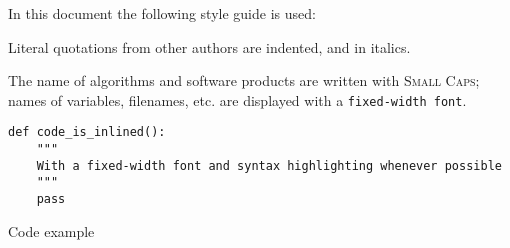 In this document the following style guide is used:

\begin{displayquote}
    Literal quotations from other authors are indented, and in italics.
\end{displayquote}

The name of algorithms and software products are written with \textsc{Small Caps};
names of variables, filenames, etc. are displayed with a \texttt{fixed-width font}.

\begin{listing}[ht]
\begin{verbatim}
def code_is_inlined():
    """
    With a fixed-width font and syntax highlighting whenever possible
    """
    pass
\end{verbatim}
\caption{Code example}
\end{listing}
